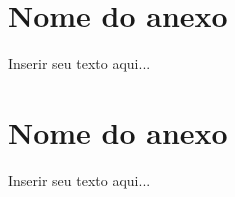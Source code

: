 %
%

\begin{anexosenv}
\partanexos

\chapter{Nome do anexo}
\label{chap:anexox}

Inserir seu texto aqui...

\chapter{Nome do anexo}
\label{chap:anexoy}

Inserir seu texto aqui...

\end{anexosenv}